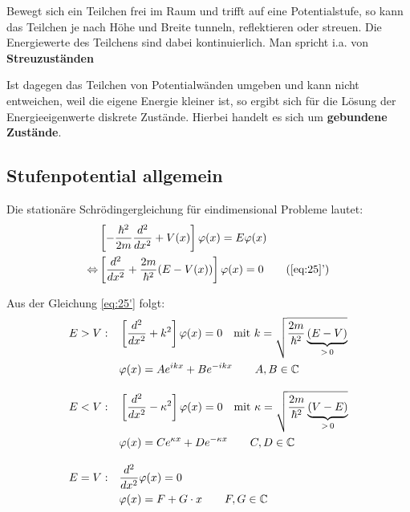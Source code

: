 Bewegt sich ein Teilchen frei im Raum und trifft auf eine Potentialstufe, so kann das Teilchen je nach Höhe und Breite tunneln, reflektieren oder streuen. Die Energiewerte des Teilchens sind dabei kontinuierlich. Man spricht i.a. von \textbf{Streuzuständen}

Ist dagegen das Teilchen von Potentialwänden umgeben und kann nicht entweichen, weil die eigene Energie kleiner ist, so ergibt sich für die Lösung der Energieeigenwerte diskrete Zustände. Hierbei handelt es sich um \textbf{gebundene Zustände}.

\subsection{Stufenpotential allgemein}

Die stationäre Schrödingergleichung für eindimensional Probleme lautet:
\begin{align} 
  &\left[-\frac{\hbar^2}{2m}\frac{d^2}{dx^2}+V(x)\right]\varphi(x)
  =E\varphi(x)\label{eq:25}\\
  \Leftrightarrow &\left[\frac{d^2}{dx^2} 
    +\frac{2m}{\hbar^2}(E-V(x))\right]\varphi(x)=0 
  \tag{\ref{eq:25}'}\label{eq:25'} 
\end{align}

Aus der Gleichung \eqref{eq:25'} folgt:
\begin{subequations}
  \label{eq:27}
  \begin{align}
    E>V: \quad &\left[\frac{d^2}{dx^2}+k^2\right]\varphi(x)=0 
    \quad \textrm{mit } k=\sqrt{\frac{2m}{\hbar^2}\underbrace{(E-V)}_{>\,0}} \notag \\
    &\varphi(x)=Ae^{ikx}+Be^{-ikx}  
    \qquad  A,B \in \mathbb{C} \label{eq:27a} \\[2ex]
    E<V: \quad &\left[\frac{d^2}{dx^2}-\kappa^2\right]\varphi(x)=0
    \quad  \textrm{mit } \kappa=\sqrt{\frac{2m}{\hbar^2}\underbrace{(V-E)}_{>\,0}} \notag \\
    &\varphi(x)=Ce^{\kappa x}+De^{-\kappa x}  
    \qquad  C,D \in \mathbb{C} \label{eq:27b}\\[2ex]
    E=V: \quad &\frac{d^2}{dx^2}\varphi(x)=0 \notag \\
    &\varphi(x)=F+G\cdot x   
    \qquad  F,G \in \mathbb{C} \label{eq:27c}
  \end{align}
\end{subequations}

